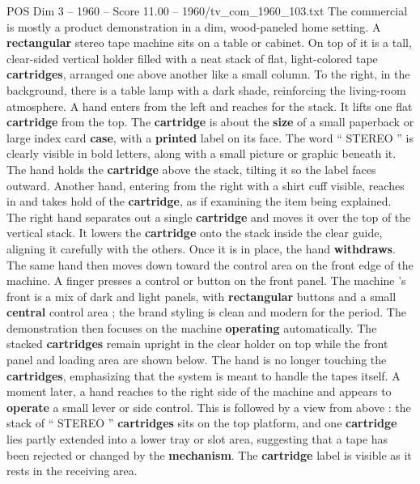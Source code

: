 \begin{textsample}{POS Dim 3 – 1960 – Score 11.00 – 1960/tv\_com\_1960\_103.txt}  \label{ex:f3_pos_030}
The commercial is mostly a product demonstration in a dim, wood-paneled home setting.
A \textbf{rectangular} stereo tape machine sits on a table or cabinet.
On top of it is a tall, clear-sided vertical holder filled with a neat stack of flat, light-colored tape \textbf{cartridges}, arranged one above another like a small column.
To the right, in the background, there is a table lamp with a dark shade, reinforcing the living-room atmosphere.
A hand enters from the left and reaches for the stack.
It lifts one flat \textbf{cartridge} from the top.
The \textbf{cartridge} is about the \textbf{size} of a small paperback or large index card \textbf{case}, with a \textbf{printed} label on its face.
The word “ STEREO ” is clearly visible in bold letters, along with a small picture or graphic beneath it.
The hand holds the \textbf{cartridge} above the stack, tilting it so the label faces outward.
Another hand, entering from the right with a shirt cuff visible, reaches in and takes hold of the \textbf{cartridge}, as if examining the item being explained.
The right hand separates out a single \textbf{cartridge} and moves it over the top of the vertical stack.
It lowers the \textbf{cartridge} onto the stack inside the clear guide, aligning it carefully with the others.
Once it is in place, the hand \textbf{withdraws}.
The same hand then moves down toward the control area on the front edge of the machine.
A finger presses a control or button on the front panel.
The machine ’s front is a mix of dark and light panels, with \textbf{rectangular} buttons and a small \textbf{central} control area ; the brand styling is clean and modern for the period.
The demonstration then focuses on the machine \textbf{operating} automatically.
The stacked \textbf{cartridges} remain upright in the clear holder on top while the front panel and loading area are shown below.
The hand is no longer touching the \textbf{cartridges}, emphasizing that the system is meant to handle the tapes itself.
A moment later, a hand reaches to the right side of the machine and appears to \textbf{operate} a small lever or side control.
This is followed by a view from above : the stack of “ STEREO ” \textbf{cartridges} sits on the top platform, and one \textbf{cartridge} lies partly extended into a lower tray or slot area, suggesting that a tape has been rejected or changed by the \textbf{mechanism}.
The \textbf{cartridge} label is visible as it rests in the receiving area.

\end{textsample}
